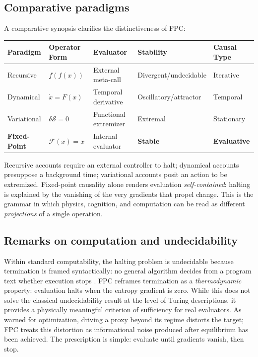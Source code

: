 \documentclass[12pt,a4paper]{article}
\newcommand{\F}{\mathcal{F}}          %
\theoremstyle{plain}
\begin{document}
\subsection{Comparative paradigms}
A comparative synopsis clarifies the distinctiveness of FPC:

\begin{center}
\begin{tabular}{@{}lllll@{}}
\toprule
\textbf{Paradigm} & \textbf{Operator Form} & \textbf{Evaluator} & \textbf{Stability} & \textbf{Causal Type} \\
\midrule
Recursive   & \(f(f(x))\)            & External meta-call   & Divergent/undecidable & Iterative \\
Dynamical   & \(\dot{x}=F(x)\)       & Temporal derivative  & Oscillatory/attractor & Temporal \\
Variational & \(\delta \mathcal{S}=0\)& Functional extremizer& Extremal              & Stationary \\
\textbf{Fixed-Point} & \(\F(x)=x\)     & Internal evaluator   & \textbf{Stable}       & \textbf{Evaluative} \\
\bottomrule
\end{tabular}
\end{center}

Recursive accounts require an external controller to halt; dynamical accounts presuppose a background time; variational accounts posit an action to be extremized. Fixed-point causality alone renders evaluation \emph{self-contained}: halting is explained by the vanishing of the very gradients that propel change. This is the grammar in which physics, cognition, and computation can be read as different \emph{projections} of a single operation.

\subsection{Remarks on computation and undecidability}
Within standard computability, the halting problem is undecidable because termination is framed syntactically: no general algorithm decides from a program text whether execution stops \citep{turing1936computable}. FPC reframes termination as a \emph{thermodynamic} property: evaluation halts when the entropy gradient is zero. While this does not solve the classical undecidability result at the level of Turing descriptions, it provides a physically meaningful criterion of sufficiency for real evaluators. As \citet{goodhart1975problems} warned for optimization, driving a proxy beyond its regime distorts the target; FPC treats this distortion as informational noise produced after equilibrium has been achieved. The prescription is simple: evaluate until gradients vanish, then stop.
\end{document}
